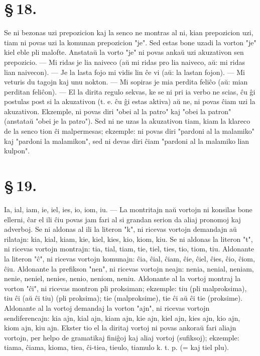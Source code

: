\section*{\S\,18.}
Se ni bezonas uzi prepozicion kaj la senco ne montras al ni, kian
prepozicion uzi, tiam ni povas uzi la komunan prepozicion "je".
Sed estas bone uzadi la vorton "je" kiel eble pli malofte.
Anstata\u u la vorto "je" ni povas anka\u u uzi akuzativon sen
prepozicio.
--- Mi ridas je lia naiveco (a\u u mi ridas pro lia naiveco, a\u u:
mi ridas lian naivecon). --- Je la lasta fojo mi vidis lin \^ce vi
(a\u u: la lastan fojon). --- Mi veturis du tagojn kaj unu nokton.
--- Mi sopiras je mia perdita feli\^co (a\u u: mian perditan
feli\^con).
--- El la dirita regulo sekvas, ke se ni pri ia verbo ne scias, \^cu
\^gi postulas post si la akuzativon (t. e. \^cu \^gi estas aktiva)
a\u u ne, ni povas \^ciam uzi la akuzativon. Ekzemple, ni povas diri
"obei al la patro" kaj "obei la patron" (anstata\u u "obei je
la patro"). Sed ni ne uzas la akuzativon tiam, kiam la klareco de
la senco tion \^ci malpermesas; ekzemple: ni povas diri "pardoni al
la malamiko" kaj "pardoni la malamikon", sed ni devas diri \^ciam
"pardoni al la malamiko lian kulpon".


\section*{\S\,19.}
Ia, ial, iam, ie, iel, ies, io, iom, iu. --- La montritajn na\u u
vortojn ni konsilas bone ellerni, \^car el ili \^ciu povas jam fari
al si grandan serion da aliaj pronomoj kaj adverboj. Se ni aldonas
al ili la literon "k", ni ricevas vortojn demandajn a\u u
rilatajn: kia, kial, kiam, kie, kiel, kies, kio, kiom, kiu. Se ni
aldonas la literon "t", ni ricevas vortojn montrajn: tia, tial,
tiam, tie, tiel, ties, tio, tiom, tiu. Aldonante la literon "\^c",
ni ricevas vortojn komunajn: \^cia, \^cial, \^ciam, \^cie, \^ciel,
\^cies, \^cio, \^ciom, \^ciu. Aldonante la prefikson "nen", ni
ricevas vortojn neajn: nenia, nenial, neniam, nenie, neniel, nenies,
nenio, neniom, neniu. Aldonante al la vortoj montraj la vorton
"\^ci", ni ricevas montron pli proksiman; ekzemple: tiu (pli
malproksima), tiu \^ci (a\u u \^ci tiu) (pli proksima); tie
(malproksime), tie \^ci a\u u \^ci tie (proksime). Aldonante al la
vortoj demandaj la vorton "ajn", ni ricevas vortojn
sendiferencajn: kia ajn, kial ajn, kiam ajn, kie ajn, kiel ajn, kies
ajn, kio ajn, kiom ajn, kiu ajn. Ekster tio el la diritaj vortoj ni
povas ankora\u u fari aliajn vortojn, per helpo de gramatikaj
fini\^goj kaj aliaj vortoj (sufiksoj); ekzemple: tiama, \^ciama,
kioma, tiea, \^ci-tiea, tieulo, tiamulo k. t. p. (= kaj tiel plu).


